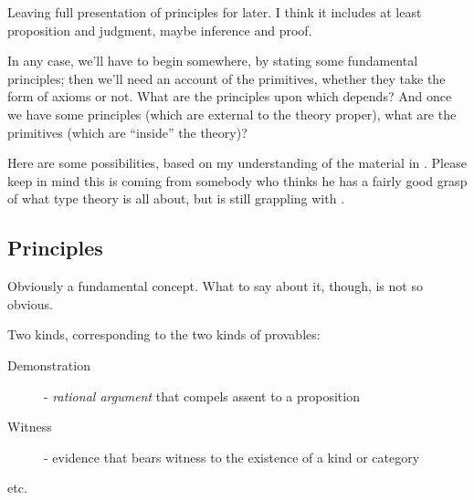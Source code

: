 \begin{remark}
  Leaving full presentation of principles for later.  I think it
  includes at least proposition and judgment, maybe inference and
  proof.
\end{remark}

In any case, we'll have to begin somewhere, by stating some
fundamental principles; then we'll need an account of the primitives,
whether they take the form of axioms or not.  What are the principles
upon which \HoTT depends?  And once we have some principles (which are
external to the theory proper), what are the primitives (which are
``inside'' the theory)?

Here are some possibilities, based on my understanding of the material
in \HoTTB.  Please keep in mind this is coming from somebody who
thinks he has a fairly good grasp of what type theory is all about,
but is still grappling with \HoTT.

\subsection{\HoTT Principles}
\label{subs:hottprinciples}

\begin{description}
\item [Type] Obviously a fundamental concept.  What to say about it, though, is
  not so obvious.
\item [Proposition]
\item [Judgment]
\item [Proof] Two kinds, corresponding to the two kinds of
  provables:
\begin{description}
\item [Demonstration] - \textit{rational argument} that compels assent
  to a proposition
\item [Witness] - evidence that bears witness to the existence of a kind or category
\end{description}
\item [Inference]
\item etc.
\end{description}

